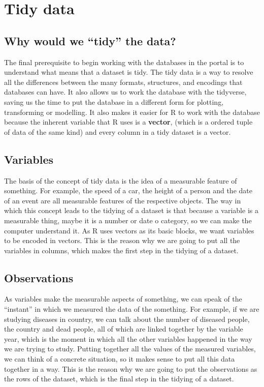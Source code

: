 \documentclass[]{book}
\begin{document}
\section{Tidy data}\label{tidy-data}

\subsection{\texorpdfstring{Why would we ``tidy'' the
data?}{Why would we tidy the data?}}\label{why-would-we-tidy-the-data}

The final prerequisite to begin working with the databases in the portal
is to understand what means that a dataset is tidy. The tidy data is a
way to resolve all the differences between the many formats, structures,
and encodings that databases can have. It also allows us to work the
database with the tidyverse, saving us the time to put the database in a
different form for plotting, transforming or modelling. It also makes it
easier for R to work with the database because the inherent variable
that R uses is a \textbf{vector}, (which is a ordered tuple of data of
the same kind) and every column in a tidy dataset is a vector.

\subsection{Variables}\label{variables}

The basis of the concept of tidy data is the idea of a measurable
feature of something. For example, the speed of a car, the height of a
person and the date of an event are all measurable features of the
respective objects. The way in which this concept leads to the tidying
of a dataset is that because a variable is a measurable thing, maybe it
is a number or date o category, so we can make the computer understand
it. As R uses vectors as its basic blocks, we want variables to be
encoded in vectors. This is the reason why we are going to put all the
variables in columns, which makes the first step in the tidying of a
dataset.

\subsection{Observations}\label{observations}

As variables make the measurable aspects of something, we can speak of
the ``instant'' in which we measured the data of the something. For
example, if we are studying diseases in country, we can talk about the
number of diseased people, the country and dead people, all of which are
linked together by the variable year, which is the moment in which all
the other variables happened in the way we are trying to study. Putting
together all the values of the measured variables, we can think of a
concrete situation, so it makes sense to put all this data together in a
way. This is the reason why we are going to put the observations as the
rows of the dataset, which is the final step in the tidying of a
dataset.
\end{document}

